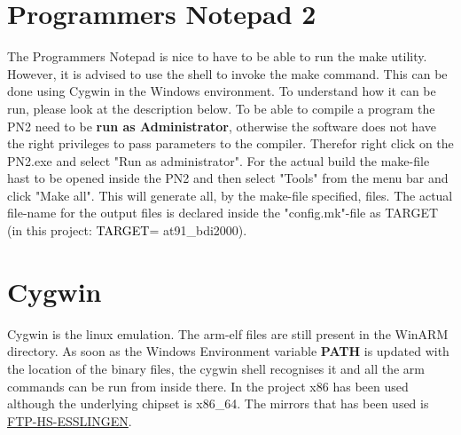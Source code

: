 \section{Programmers Notepad 2}
The Programmers Notepad is nice to have to be able to run the make utility. However, it is advised to use the shell to invoke the make command. This can be done using Cygwin in the Windows environment. To understand how it can be run, please look at the description below.
To be able to compile a program the \ac{PN2} need to be \textbf{run as Administrator}, otherwise the software does not have the right privileges to pass parameters to the compiler. Therefor right click on the \ac{PN2}.exe and select "Run as administrator". For the actual build the make-file hast to be opened inside the \ac{PN2} and then select "Tools" from the menu bar and click "Make all". This will generate all, by the make-file specified, files. The actual file-name for the output files is declared inside the "config.mk"-file as TARGET (in this project: {\textcolor{black}{TARGET}}= at91\_bdi2000).\\

\section{Cygwin}
Cygwin is the linux emulation. The arm-elf files are still present in the WinARM directory. As soon as the Windows Environment variable \textbf{PATH} is updated with the location of the binary files, the cygwin shell recognises it and all the arm commands can be run from inside there. In the project x86 has been used although the underlying chipset is x86\_64. The mirrors that has been used is \href{http://ftp-stud.hs-esslingen.de/pub/Mirrors/sources.redhat.com/cygwin/x86/}{FTP-HS-ESSLINGEN}. \\

